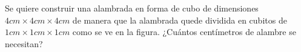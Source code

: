 Se quiere construir una alambrada en forma de cubo de dimensiones $4 cm \times  4 cm \times  4 cm$ de manera que la alambrada quede dividida en cubitos de $1 cm \times  1 cm \times  1 cm$ como se ve en la figura. ¿Cuántos centímetros de alambre se necesitan?